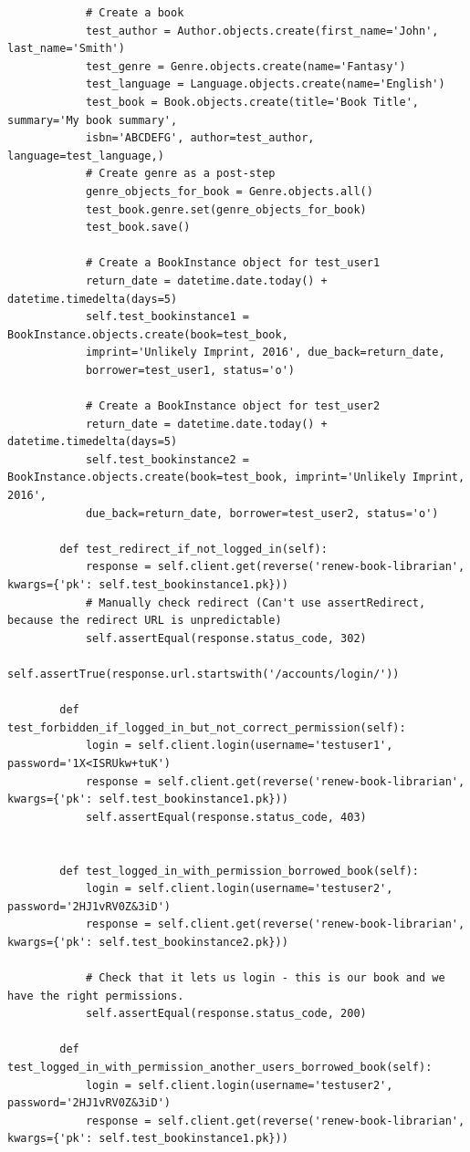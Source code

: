 \documentclass[12pt, a4paper]{report}
\begin{document}
\begin{lstlisting}
			# Create a book
			test_author = Author.objects.create(first_name='John', last_name='Smith')
			test_genre = Genre.objects.create(name='Fantasy')
			test_language = Language.objects.create(name='English')
			test_book = Book.objects.create(title='Book Title', summary='My book summary',
			isbn='ABCDEFG', author=test_author, language=test_language,)
			# Create genre as a post-step
			genre_objects_for_book = Genre.objects.all()
			test_book.genre.set(genre_objects_for_book)
			test_book.save()
	
			# Create a BookInstance object for test_user1
			return_date = datetime.date.today() + datetime.timedelta(days=5)
			self.test_bookinstance1 = BookInstance.objects.create(book=test_book,
			imprint='Unlikely Imprint, 2016', due_back=return_date,
			borrower=test_user1, status='o')
	
			# Create a BookInstance object for test_user2
			return_date = datetime.date.today() + datetime.timedelta(days=5)
			self.test_bookinstance2 = BookInstance.objects.create(book=test_book, imprint='Unlikely Imprint, 2016',
			due_back=return_date, borrower=test_user2, status='o')
	
		def test_redirect_if_not_logged_in(self):
			response = self.client.get(reverse('renew-book-librarian', kwargs={'pk': self.test_bookinstance1.pk}))
			# Manually check redirect (Can't use assertRedirect, because the redirect URL is unpredictable)
			self.assertEqual(response.status_code, 302)
			self.assertTrue(response.url.startswith('/accounts/login/'))
	
		def test_forbidden_if_logged_in_but_not_correct_permission(self):
			login = self.client.login(username='testuser1', password='1X<ISRUkw+tuK')
			response = self.client.get(reverse('renew-book-librarian', kwargs={'pk': self.test_bookinstance1.pk}))
			self.assertEqual(response.status_code, 403)
	
	
		def test_logged_in_with_permission_borrowed_book(self):
			login = self.client.login(username='testuser2', password='2HJ1vRV0Z&3iD')
			response = self.client.get(reverse('renew-book-librarian', kwargs={'pk': self.test_bookinstance2.pk}))
	
			# Check that it lets us login - this is our book and we have the right permissions.
			self.assertEqual(response.status_code, 200)
	
		def test_logged_in_with_permission_another_users_borrowed_book(self):
			login = self.client.login(username='testuser2', password='2HJ1vRV0Z&3iD')
			response = self.client.get(reverse('renew-book-librarian', kwargs={'pk': self.test_bookinstance1.pk}))
	

\end{lstlisting}
\end{document}
